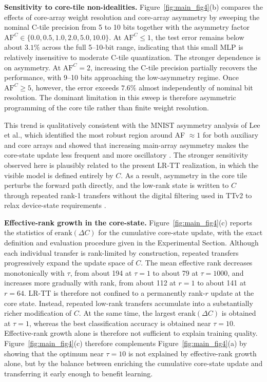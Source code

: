 \documentclass[AMA,LATO2COL]{WileyNJDv5}
\begin{document}
\noindent\textbf{Sensitivity to core-tile non-idealities.}
Figure~\ref{fig:main_fig4}(b) compares the effects of core-array weight resolution and core-array asymmetry by sweeping the nominal C-tile precision from 5 to 10 bits together with the asymmetry factor \(\mathrm{AF}^{C}\in\{0.0,0.5,1.0,2.0,5.0,10.0\}\). At \(\mathrm{AF}^{C}\leq 1\), the test error remains below about \(3.1\%\) across the full 5--10-bit range, indicating that this small MLP is relatively insensitive to moderate C-tile quantization. The stronger dependence is on asymmetry. At \(\mathrm{AF}^{C}=2\), increasing the C-tile precision partially recovers the performance, with 9--10 bits approaching the low-asymmetry regime. Once \(\mathrm{AF}^{C}\geq 5\), however, the error exceeds \(7.6\%\) almost independently of nominal bit resolution. The dominant limitation in this sweep is therefore asymmetric programming of the core tile rather than finite weight resolution.

\noindent
This trend is qualitatively consistent with the MNIST asymmetry analysis of Lee et al., which identified the most robust region around AF $\approx 1$ for both auxiliary and core arrays and showed that increasing main-array asymmetry makes the core-state update less frequent and more oscillatory \cite{lee2022tikitaka_asymmetry}. The stronger sensitivity observed here is plausibly related to the present LR-TT realization, in which the visible model is defined entirely by $C$. As a result, asymmetry in the core tile perturbs the forward path directly, and the low-rank state is written to $C$ through repeated rank-1 transfers without the digital filtering used in TTv2 to relax device-state requirements \cite{rasch2024fastrobust}. 

\noindent\textbf{Effective-rank growth in the core-state.}
Figure~\ref{fig:main_fig4}(c) reports the statistics of \(\mathrm{erank}(\Delta C)\) for the cumulative core-state update, with the exact definition and evaluation procedure given in the Experimental Section. Although each individual transfer is rank-limited by construction, repeated transfers progressively expand the update space of \(C\). The mean effective rank decreases monotonically with \(\tau\), from about 194 at \(\tau=1\) to about 79 at \(\tau=1000\), and increases more gradually with rank, from about 112 at \(r=1\) to about 141 at \(r=64\). LR-TT is therefore not confined to a permanently rank-\(r\) update at the core state. Instead, repeated low-rank transfers accumulate into a substantially richer modification of \(C\). At the same time, the largest \(\mathrm{erank}(\Delta C)\) is obtained at \(\tau=1\), whereas the best classification accuracy is obtained near \(\tau=10\). Effective-rank growth alone is therefore not sufficient to explain training quality. Figure~\ref{fig:main_fig4}(c) therefore complements Figure~\ref{fig:main_fig4}(a) by showing that the optimum near $\tau=10$ is not explained by effective-rank growth alone, but by the balance between enriching the cumulative core-state update and transferring it early enough to benefit learning. 
\end{document}
